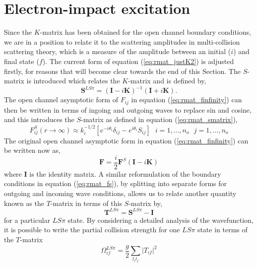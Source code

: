 \section{Electron-impact excitation}\label{sec:electron}
Since the $K$-matrix has been obtained for the open channel boundary conditions, we are in a position to relate it to the scattering amplitudes in multi-collision scattering theory, which is a measure of the amplitude between an initial ($i$) and final state ($f$). The current form of equation (\ref{eq:rmat_justK2}) is adjusted firstly, for reasons that will become clear towards the end of this Section. The $S$-matrix is introduced which relates the $K$-matrix and is defined by,
\begin{equation}\label{eq:rmat_smatrix}
\boldsymbol{S}^{LS\pi} = (\boldsymbol{I}-i\boldsymbol{K})^{-1}(\boldsymbol{I}+i\boldsymbol{K}).
\end{equation}
The open channel asymptotic form of $F_{ij}$ in equation (\ref{eq:rmat_finfinity}) can then be written in terms of ingoing and outgoing waves to replace sin and cosine, and this introduces the $S$-matrix as defined in equation (\ref{eq:rmat_smatrix}),
\begin{equation}\label{eq:rmat_fs}
F^{S}_{ij}(r\rightarrow \infty) \approx k_i^{-1/2}[e^{-i\theta_i}\delta_{ij} - e^{i\theta_i}S_{ij}] ~~~ i=1,...,n_o ~~~ j=1,...,n_o
\end{equation}
The original open channel asymptotic form in equation (\ref{eq:rmat_finfinity}) can be written now as,
\begin{equation}
\boldsymbol{F}= \frac{i}{2}\boldsymbol{F}^{S}(\boldsymbol{I} - i\boldsymbol{K})
\end{equation}
where $\boldsymbol{I}$ is the identity matrix. A similar reformulation of the boundary conditions in equation (\ref{eq:rmat_fs}), by splitting into separate forms for outgoing and incoming wave conditions, allows us to relate another quantity known as the $T$-matrix in terms of this $S$-matrix by,
\begin{equation}\label{eq:rmat_tmatrix}
\boldsymbol{T}^{LS\pi} =\boldsymbol{S}^{LS\pi} - \boldsymbol{I}
\end{equation}
for a particular $LS\pi$ state. By considering a detailed analysis of the wavefunction, it is possible to write the partial collision strength for one $LS\pi$ state in terms of the $T$-matrix
\begin{equation}\label{eq:rmat_collstrength}
\Omega^{LS\pi}_{if} = \frac{g}{2}\sum_{l_il_f}|T_{if}|^2
\end{equation}

